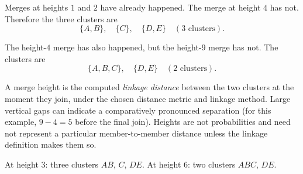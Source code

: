 Merges at heights $1$ and $2$ have already happened. The merge at height $4$ has not. Therefore the three clusters are
\[
\boxed{\{A,B\},\quad \{C\},\quad \{D,E\}}\quad (3\text{ clusters}).
\]

The height-$4$ merge has also happened, but the height-$9$ merge has not. The clusters are
\[
\boxed{\{A,B,C\},\quad \{D,E\}}\quad (2\text{ clusters}).
\]

A merge height is the computed \emph{linkage distance} between the two clusters at the moment they join, under the chosen distance metric and linkage method. Large vertical gaps can indicate a comparatively pronounced separation (for this example, $9-4=5$ before the final join). Heights are not probabilities and need not represent a particular member-to-member distance unless the linkage definition makes them so.
\begin{answer}
At height $3$: three clusters $AB$, $C$, $DE$. At height $6$: two clusters $ABC$, $DE$.
\end{answer}
